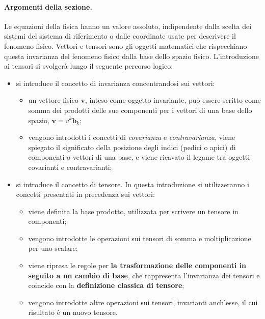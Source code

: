 \noindent
\paragraph{Argomenti della sezione.} Le equazioni della fisica hanno un valore assoluto, indipendente dalla scelta dei sistemi del sistema di riferimento o dalle coordinate usate per descrivere il fenomeno fisico. Vettori e tensori sono gli oggetti matematici che rispecchiano questa invarianza del fenomeno fisico dalla base dello spazio fisico. L'introduzione ai tensori si svolgerà lungo il seguente percorso logico:
\begin{itemize}
 \item si introduce il concetto di invarianza concentrandosi sui vettori: 
\begin{itemize}
    \item un vettore fisico $\bm{v}$, inteso come oggetto invariante, può essere scritto come somma dei prodotti delle sue componenti per i vettori di una base dello spazio, $\bm{v} = v^k \bm{b}_k$;
  \item vengono introdotti i concetti di \textit{covarianza} e \textit{contravarianza}, viene spiegato il significato della posizione degli indici (pedici o apici) di componenti o vettori di una base, e viene ricavato il legame tra oggetti covarianti e contravarianti;
\end{itemize}
 \item si introduce il concetto di tensore. In questa introduzione si utilizzeranno i concetti presentati in precedenza sui vettori:
 \begin{itemize}
  \item viene definita la base prodotto, utilizzata per scrivere un tensore in componenti;
  \item vengono introdotte le operazioni sui tensori di somma e moltiplicazione per uno scalare;
  \item viene ripresa le regole per \textbf{la trasformazione delle componenti in seguito a un cambio di base}, che rappresenta l'invarianza dei tensori e coincide con la \textbf{definizione classica di tensore};
  \item vengono introdotte altre operazioni sui tensori, invarianti anch'esse, il cui risultato è un nuovo tensore.
 \end{itemize}
\end{itemize}

